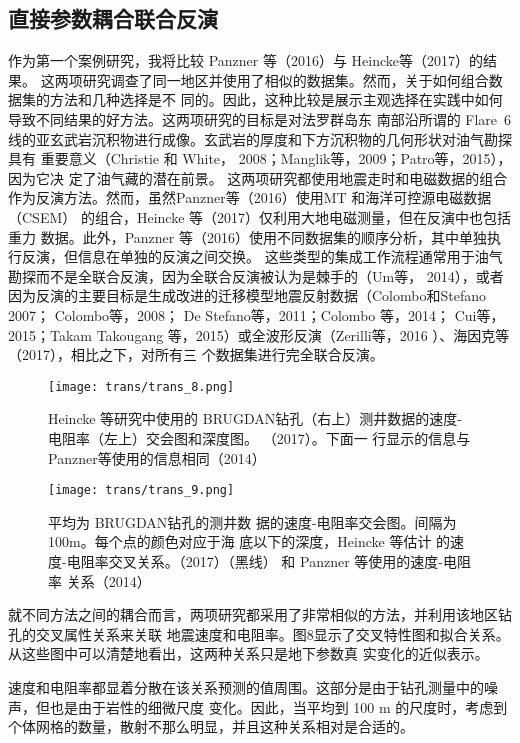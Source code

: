 \subsection{直接参数耦合联合反演}

作为第一个案例研究，我将比较 Panzner 等（2016）与 Heincke等（2017）的结果。
这两项研究调查了同一地区并使用了相似的数据集。然而，关于如何组合数据集的方法和几种选择是不 同的。因此，这种比较是展示主观选择在实践中如何导致不同结果的好方法。这两项研究的目标是对法罗群岛东 南部沿所谓的 Flare\ 6 线的亚玄武岩沉积物进行成像。玄武岩的厚度和下方沉积物的几何形状对油气勘探具有 重要意义（Christie 和 White， 2008；Manglik等，2009；Patro等，2015），因为它决 定了油气藏的潜在前景。 这两项研究都使用地震走时和电磁数据的组合作为反演方法。然而，虽然Panzner等（2016）使用MT 和海洋可控源电磁数据 （CSEM） 的组合，Heincke 等（2017）仅利用大地电磁测量，但在反演中也包括重力 数据。此外，Panzner 等（2016）使用不同数据集的顺序分析，其中单独执行反演，但信息在单独的反演之间交换。 这些类型的集成工作流程通常用于油气勘探而不是全联合反演，因为全联合反演被认为是棘手的（Um等， 2014），或者因为反演的主要目标是生成改进的迁移模型地震反射数据（Colombo和Stefano 2007； Colombo等，2008； De Stefano等，2011；Colombo 等，2014； Cui等，2015；Takam Takougang 等，2015）或全波形反演（Zerilli等，2016 ）、海因克等（2017），相比之下，对所有三 个数据集进行完全联合反演。

\begin{figure}[]
    \centering
    \texttt{[image: trans/trans\_8.png]}
    \caption{Heincke 等研究中使用的 BRUGDAN钻孔（右上）测井数据的速度-电阻率（左上）交会图和深度图。 （2017）。下面一 行显示的信息与 Panzner等使用的信息相同（2014）}

\end{figure}

\begin{figure}[]
    \centering
    \texttt{[image: trans/trans\_9.png]}
    \caption{平均为 BRUGDAN钻孔的测井数 据的速度-电阻率交会图。间隔为100m。每个点的颜色对应于海 底以下的深度，Heincke 等估计 的速度-电阻率交叉关系。（2017）（黑线） 和 Panzner 等使用的速度-电阻率 关系（2014） }

\end{figure}

就不同方法之间的耦合而言，两项研究都采用了非常相似的方法，并利用该地区钻孔的交叉属性关系来关联 地震速度和电阻率。图8显示了交叉特性图和拟合关系。从这些图中可以清楚地看出，这两种关系只是地下参数真 实变化的近似表示。

速度和电阻率都显着分散在该关系预测的值周围。这部分是由于钻孔测量中的噪声，但也是由于岩性的细微尺度 变化。因此，当平均到 100 m 的尺度时，考虑到个体网格的数量，散射不那么明显，并且这种关系相对是合适的。

